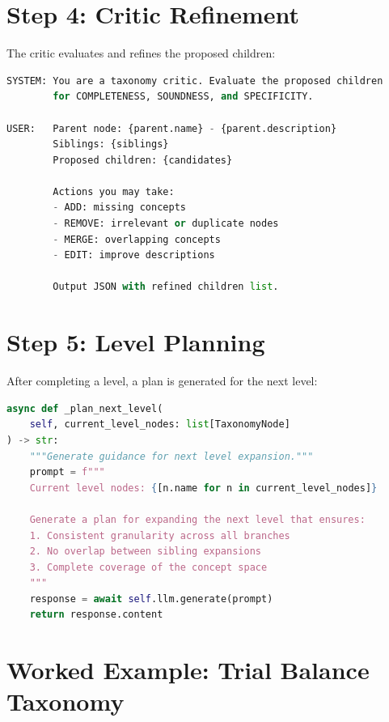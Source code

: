 \section{Step 4: Critic Refinement}

The critic evaluates and refines the proposed children:

\begin{lstlisting}[language=Python,caption={Critic refinement prompt}]
SYSTEM: You are a taxonomy critic. Evaluate the proposed children
        for COMPLETENESS, SOUNDNESS, and SPECIFICITY.
        
USER:   Parent node: {parent.name} - {parent.description}
        Siblings: {siblings}
        Proposed children: {candidates}
        
        Actions you may take:
        - ADD: missing concepts
        - REMOVE: irrelevant or duplicate nodes
        - MERGE: overlapping concepts
        - EDIT: improve descriptions
        
        Output JSON with refined children list.
\end{lstlisting}

\section{Step 5: Level Planning}

After completing a level, a plan is generated for the next level:

\begin{lstlisting}[language=Python,caption={Level planning}]
async def _plan_next_level(
    self, current_level_nodes: list[TaxonomyNode]
) -> str:
    """Generate guidance for next level expansion."""
    prompt = f"""
    Current level nodes: {[n.name for n in current_level_nodes]}
    
    Generate a plan for expanding the next level that ensures:
    1. Consistent granularity across all branches
    2. No overlap between sibling expansions
    3. Complete coverage of the concept space
    """
    response = await self.llm.generate(prompt)
    return response.content
\end{lstlisting}

\section{Worked Example: Trial Balance Taxonomy}

